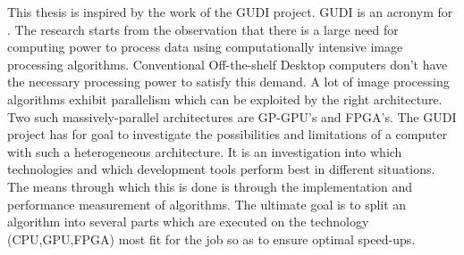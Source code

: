 This thesis is inspired by the work of the GUDI project. GUDI is an acronym for . The research starts from the observation that there is a large need for computing power to process data using computationally intensive image processing algorithms. Conventional Off-the-shelf Desktop computers don't have the necessary processing power to satisfy this demand. A lot of image processing algorithms exhibit parallelism which can be exploited by the right architecture. Two such massively-parallel architectures are GP-GPU's and FPGA's. The GUDI project has for goal to investigate the possibilities and limitations of a computer with such a heterogeneous architecture. It is an investigation into which technologies and which development tools perform best in different situations. The means through which this is done is through the implementation and performance measurement of algorithms. The ultimate goal is to split an algorithm into several parts which are executed on the technology (CPU,GPU,FPGA) most fit for the job so as to ensure optimal speed-ups.




